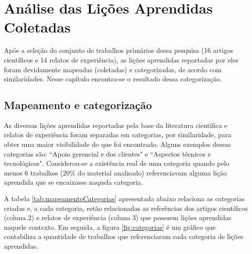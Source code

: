 \chapter{Análise das Lições Aprendidas Coletadas}

Após a seleção do conjunto de trabalhos primários dessa pesquisa (16 artigos científicos e 14 relatos de experiência), as lições aprendidas reportadas por eles foram devidamente mapeadas (coletadas) e categorizadas, de acordo com similaridades. Nesse capítulo encontra-se o resultado dessa categorização.

\section{Mapeamento e categorização}

As diversas lições aprendidas reportadas pela base da literatura científica e relatos de experiência foram separadas em categorias, por similaridade, para obter uma maior visibilidade do que foi encontrado. Alguns exemplos dessas categorias são: ``Apoio gerencial e dos clientes" e ``Aspectos técnicos e tecnológicos". Considerou-se a existência real de uma categoria quando pelo menos 6 trabalhos (20\% do material analisado) referenciavam alguma lição aprendida que se encaixasse naquela categoria.

A tabela \ref{tab:mapeamentoCategorias} apresentada abaixo relaciona as categorias criadas e, a cada categoria, estão relacionadas as referências dos artigos científicos (coluna 2) e relatos de experiência (coluna 3) que possuem lições aprendidas naquele contexto. Em seguida, a figura \ref{fig:categorias} é um gráfico que contabiliza a quantidade de trabalhos que referenciaram cada categoria de lições aprendidas.

